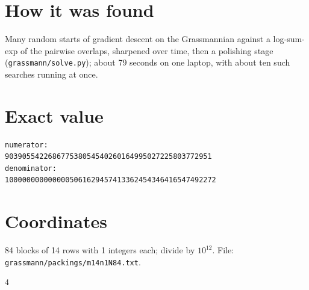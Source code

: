 \documentclass[11pt,a4paper]{article}
\begin{document}
\section{How it was found}
Many random starts of gradient descent on the Grassmannian against a log-sum-exp of the pairwise overlaps, sharpened over time, then a polishing stage (\texttt{grassmann/solve.py}); about 79 seconds on one laptop, with about ten such searches running at once.


\appendix
\section{Exact value}
{\small
\begin{verbatim}
numerator:
903905542268677538054540260164995027225803772951
denominator:
1000000000000005061629457413362454346416547492272
\end{verbatim}}

\section{Coordinates}
84 blocks of 14 rows with 1 integers each; divide by $10^{12}$. File: \texttt{grassmann/packings/m14n1N84.txt}.
{\tiny
\begin{multicols}{4}
\end{multicols}}
\end{document}
